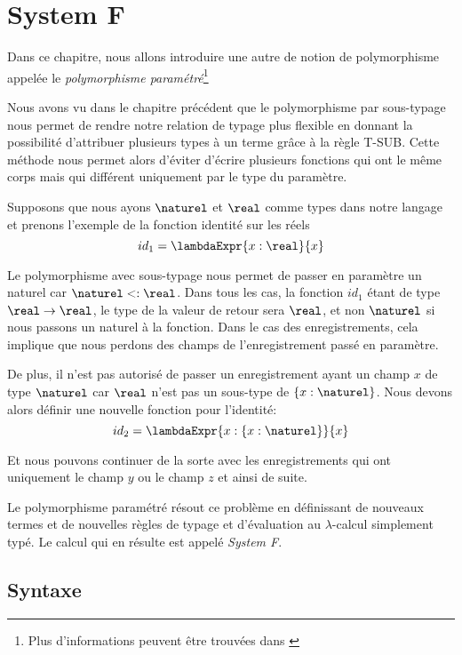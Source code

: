 \chapter{System F}
\label{chapter:system-f}

Dans ce chapitre, nous allons introduire une autre de notion de polymorphisme
appelée le \textit{polymorphisme paramétré}\footnote{Plus d'informations peuvent
être trouvées dans \cite{tapl-system-f}}

Nous avons vu dans le chapitre précédent que le polymorphisme par sous-typage
nous permet de rendre notre relation de typage plus flexible en donnant la
possibilité d'attribuer plusieurs types à un terme grâce à la règle T-SUB. Cette
méthode nous permet alors d'éviter
d'écrire plusieurs fonctions qui ont le même corps mais qui différent uniquement
par le type du paramètre.

Supposons que nous ayons $\naturel$ et $\real$ comme types dans notre langage et
prenons l'exemple de la fonction identité sur les réels
\begin{equation*}
  id_{1} = \lambdaExpr{x : \real}{x}
\end{equation*}

Le polymorphisme avec sous-typage nous permet de passer en paramètre un
naturel
car $\naturel <: \real$. Dans tous les cas, la fonction $id_{1}$ étant de type
$\real \rightarrow \real$, le type de la valeur de retour sera $\real$, et non
$\naturel$ si nous passons un naturel à la fonction.
Dans le cas des enregistrements, cela implique que nous perdons des
champs de l'enregistrement passé en paramètre.

De plus, il n'est pas autorisé de passer un
enregistrement ayant un champ $x$ de type $\naturel$ car $\real$ n'est pas
un sous-type de $\left\{ x : \naturel \right\}$. Nous devons alors définir une
nouvelle fonction pour l'identité:
\begin{equation*}
  id_{2} = \lambdaExpr{x : \left\{ x : \naturel \right\}}{x}
\end{equation*}

Et nous pouvons continuer de la sorte avec les enregistrements qui ont
uniquement le champ $y$ ou le champ $z$ et ainsi de suite.

Le polymorphisme paramétré résout ce problème en définissant de nouveaux termes
et de nouvelles règles de typage et d'évaluation au $\lambda$-calcul simplement
typé. Le calcul qui en résulte est appelé \textit{System F}.

\section{Syntaxe}

